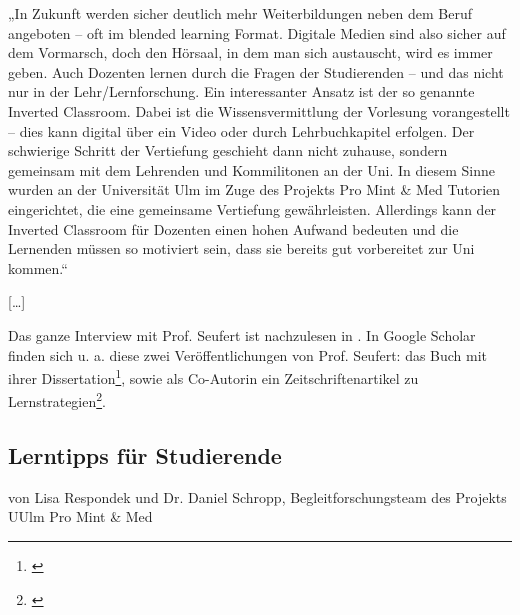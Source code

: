 „In Zukunft werden sicher deutlich mehr Weiterbildungen neben dem Beruf angeboten – oft im blended learning Format. Digitale Medien sind also sicher auf dem Vormarsch, doch den Hörsaal, in dem man sich austauscht, wird es immer geben. Auch Dozenten lernen durch die Fragen der Studierenden – und das nicht nur in der Lehr/Lernforschung. 
Ein interessanter Ansatz ist der so genannte Inverted Classroom. Dabei ist die Wissensvermittlung der Vorlesung vorangestellt – dies kann digital über ein Video oder durch Lehrbuchkapitel erfolgen. Der schwierige Schritt der Vertiefung geschieht dann nicht zuhause, sondern gemeinsam mit dem Lehrenden und Kommilitonen an der Uni. In diesem Sinne wurden an der Universität Ulm im Zuge des Projekts Pro Mint \& Med Tutorien eingerichtet, die eine gemeinsame Vertiefung gewährleisten. Allerdings kann der Inverted Classroom für Dozenten einen hohen Aufwand bedeuten und die Lernenden müssen so motiviert sein, dass sie bereits gut vorbereitet zur Uni kommen.“

[\ldots]

Das ganze Interview mit Prof. Seufert ist nachzulesen in \cite[S. 10--11]{uni-ulm-intern}.
\newpage
In Google Scholar  finden sich u. a. diese zwei Veröffentlichungen von Prof. Seufert:  das Buch mit ihrer Dissertation\footnote{\cite{seufert2003wissenserwerb}}, sowie als Co-Autorin ein Zeitschriftenartikel zu Lernstrategien\footnote{\cite{gutmann2014effekte}}.


\subsection{Lerntipps für Studierende}

von  Lisa Respondek und Dr. Daniel Schropp, Begleitforschungsteam des Projekts UUlm Pro Mint \& Med

